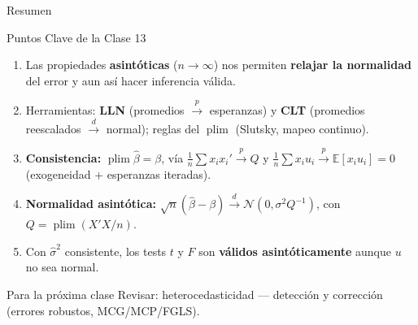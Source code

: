 \documentclass{beamer}
\DeclareMathOperator*{\plim}{plim}
\begin{document}
\begin{frame}{Resumen}

\begin{block}{Puntos Clave de la Clase 13}
\begin{enumerate}
    \item Las propiedades \textbf{asintóticas} ($n\to\infty$) nos permiten \textbf{relajar la normalidad} del error y aun así hacer inferencia válida.
    \item Herramientas: \textbf{LLN} (promedios $\overset{p}{\to}$ esperanzas) y \textbf{CLT} (promedios reescalados $\overset{d}{\to}$ normal); reglas del $\plim$ (Slutsky, mapeo continuo).
    \item \textbf{Consistencia:} $\plim\hat{\beta}=\beta$, vía $\frac{1}{n}\sum x_i x_i'\overset{p}{\to}Q$ y $\frac{1}{n}\sum x_i u_i\overset{p}{\to}\mathbb{E}[x_i u_i]=0$ (exogeneidad + esperanzas iteradas).
    \item \textbf{Normalidad asintótica:} $\sqrt{n}(\hat{\beta}-\beta)\overset{d}{\to}\mathcal{N}(0,\sigma^2 Q^{-1})$, con $Q=\plim(X'X/n)$.
    \item Con $\hat{\sigma}^2$ consistente, los tests $t$ y $F$ son \textbf{válidos asintóticamente} aunque $u$ no sea normal.
\end{enumerate}
\end{block}

\begin{alertblock}{Para la próxima clase}
Revisar: heterocedasticidad — detección y corrección (errores robustos, MCG/MCP/FGLS).
\end{alertblock}

\end{frame}
\end{document}
